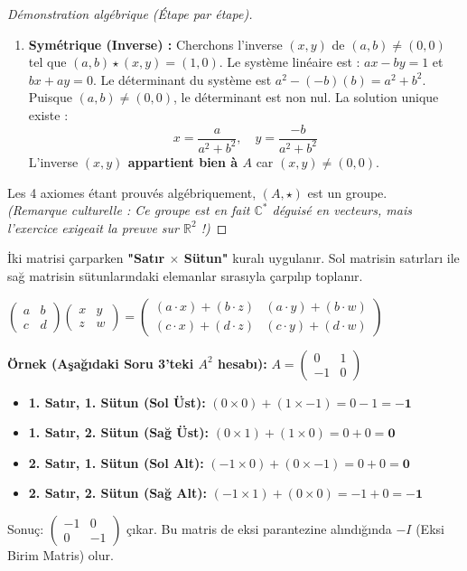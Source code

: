 \documentclass[12pt,a4paper]{report}
\begin{document}
\begin{proof}[Démonstration algébrique (Étape par étape)]
\begin{enumerate}
    \item \textbf{Symétrique (Inverse) :} Cherchons l'inverse $(x, y)$ de $(a, b) \neq (0,0)$ tel que $(a, b) \star (x, y) = (1, 0)$.
    Le système linéaire est :
    $ax - by = 1$ et $bx + ay = 0$.
    Le déterminant du système est $a^2 - (-b)(b) = a^2 + b^2$. Puisque $(a,b) \neq (0,0)$, le déterminant est non nul. La solution unique existe :
    \[ x = \frac{a}{a^2+b^2}, \quad y = \frac{-b}{a^2+b^2} \]
    L'inverse \textbf{$(x,y)$ appartient bien à $A$} car $(x,y) \neq (0,0)$.
\end{enumerate}
Les 4 axiomes étant prouvés algébriquement, $(A, \star)$ est un groupe. \\
\textit{(Remarque culturelle : Ce groupe est en fait $\mathbb{C}^*$ déguisé en vecteurs, mais l'exercice exigeait la preuve sur $\mathbb{R}^2$ !)}
\end{proof}
\begin{tcolorbox}[colback=blue!5!white,colframe=blue!75!black,title=Hatırlatma: Matris Çarpımı Nasıl Yapılır?]
İki matrisi çarparken \textbf{"Satır $\times$ Sütun"} kuralı uygulanır. Sol matrisin satırları ile sağ matrisin sütunlarındaki elemanlar sırasıyla çarpılıp toplanır.
\begin{center}
$\begin{pmatrix} a & b \\ c & d \end{pmatrix} \begin{pmatrix} x & y \\ z & w \end{pmatrix} = \begin{pmatrix} (a\cdot x) + (b\cdot z) & (a\cdot y) + (b\cdot w) \\ (c\cdot x) + (d\cdot z) & (c\cdot y) + (d\cdot w) \end{pmatrix}$
\end{center}
\textbf{Örnek (Aşağıdaki Soru 3'teki $A^2$ hesabı):} $A = \begin{pmatrix} 0 & 1 \\ -1 & 0 \end{pmatrix}$
\begin{itemize}
    \item \textbf{1. Satır, 1. Sütun (Sol Üst):} $(0 \times 0) + (1 \times -1) = 0 - 1 = \mathbf{-1}$
    \item \textbf{1. Satır, 2. Sütun (Sağ Üst):} $(0 \times 1) + (1 \times 0) = 0 + 0 = \mathbf{0}$
    \item \textbf{2. Satır, 1. Sütun (Sol Alt):} $(-1 \times 0) + (0 \times -1) = 0 + 0 = \mathbf{0}$
    \item \textbf{2. Satır, 2. Sütun (Sağ Alt):} $(-1 \times 1) + (0 \times 0) = -1 + 0 = \mathbf{-1}$
\end{itemize}
Sonuç: $\begin{pmatrix} -1 & 0 \\ 0 & -1 \end{pmatrix}$ çıkar. Bu matris de eksi parantezine alındığında $-I$ (Eksi Birim Matris) olur.
\end{tcolorbox}
\end{document}
